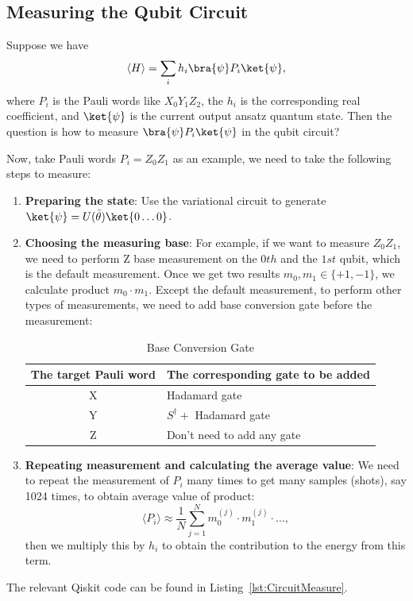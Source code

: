 \subsection{Measuring the Qubit Circuit}
Suppose we have
\begin{equation}
    \langle H\rangle =\sum_i h_i\bra{\psi}P_i\ket{\psi},
\end{equation}
where $P_i$ is the Pauli words like $X_0Y_1Z_2$,  the $h_i$ is the corresponding real coefficient, and $\ket{\psi}$ is the current output ansatz quantum state. Then the question is how to measure $\bra{\psi}P_i\ket{\psi}$ in the qubit circuit?

Now, take Pauli words $P_i=Z_0Z_1$ as an example, we need to take the following steps to measure:
\begin{enumerate}
    \item \textbf{Preparing the state}: Use the variational circuit to generate $\ket{\psi}=U(\bar{\theta})\ket{0\dots0}$.
    \item \textbf{Choosing the measuring base}: For example, if we want to measure $Z_0Z_1$, we need to perform Z base measurement on the $0th$ and the $1st$ qubit, which is the default measurement. Once we get two results $m_0, m_1\in\{+1, -1\}$, we calculate product $m_0\cdot m_1$. Except the default measurement, to perform other types of measurements, we need to add base conversion gate before the measurement:
    \begin{table}[h!]
        \centering
        \caption{Base Conversion Gate}
        \label{tab:BaseConversion}
        \begin{tabular}{c|l}
        \toprule
          The target Pauli word   & The corresponding gate to be added \\
        \midrule
            X & Hadamard gate \\
            Y & $S^\dagger+$ Hadamard gate \\
            Z & Don't need to add any gate \\
        \bottomrule
        \end{tabular}
    \end{table}
    \item \textbf{Repeating measurement and calculating the average value}: We need to repeat the measurement of $P_i$ many times to get many samples (shots), say 1024 times, to obtain average value of product:
    \begin{equation}
        \langle P_i\rangle \approx \frac{1}{N}\sum_{j=1}^N m_0^{(j)}\cdot m_1^{(j)}\cdot\dots ,
    \end{equation}
    then we multiply this by $h_i$ to obtain the contribution to the energy from this term.
\end{enumerate}
The relevant Qiskit code can be found in Listing~\ref{lst:CircuitMeasure}.

